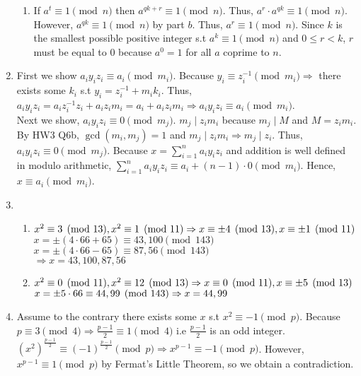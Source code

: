 \documentclass[10pt]{article}
\begin{document}
\begin{enumerate}[label= \arabic*.]
\begin{enumerate}
        \item If $a^t\equiv 1\pmod{n}$ then $a^{qk+r}\equiv 1\pmod{n}$. 
        Thus, $a^r\cdot a^{qk}\equiv 1\pmod{n}$. 
        However, $a^{qk}\equiv 1\pmod{n}$ by part $b$. 
        Thus, $a^r\equiv 1\pmod{n}$. 
        Since $k$ is the smallest possible positive integer s.t $a^k\equiv 1\pmod{n}$ and $0\le r<k$, $r$ must be equal to $0$ because $a^0=1$ for all $a$ coprime to $n$.
    \end{enumerate}
    \item First we show $a_i y_i z_i\equiv a_i\pmod{m_i}$. Because $y_i\equiv z_i^{-1}\pmod{m_i}\Rightarrow$ there exists some $k_i$ s.t $y_i=z_i^{-1}+m_ik_i$. 
    Thus, $a_i y_i z_i=a_i z_i^{-1}z_i+a_i z_i m_i=a_i+a_i z_i m_i\Rightarrow a_i y_i z_i\equiv a_i\pmod{m_i}$.\\
    Next we show, $a_i y_i z_i\equiv 0\pmod{m_j}$. $m_j\mid z_i m_i$ because $m_j\mid M$ and $M=z_i m_i$.
    By HW3 Q6b, $\gcd(m_i,m_j)=1$ and $m_j\mid z_i m_i\Rightarrow m_j\mid z_i$.
    Thus, $a_i y_i z_i\equiv 0\pmod{m_j}$.
    Because $x=\sum_{i=1}^{n}a_iy_iz_i$ and addition is well defined in modulo arithmetic, $\sum_{i=1}^{n}a_iy_iz_i\equiv a_i+(n-1)\cdot 0\pmod{m_i}$. 
    Hence, $x\equiv a_i\pmod{m_i}$.
    \item \begin{enumerate}
        \item $x^2\equiv 3\pmod{13},x^2\equiv 1\pmod{11}\\
        \Rightarrow x\equiv \pm4\pmod{13},x\equiv\pm 1\pmod{11}$\\
        $x=\pm(4\cdot 66+65)\equiv 43,100\pmod{143}$\\
        $x=\pm(4\cdot 66-65)\equiv 87,56\pmod{143}$\\
        $\Rightarrow x=43,100,87,56$
        \item $x^2\equiv 0\pmod{11},x^2\equiv 12\pmod{13}\\
        \Rightarrow x\equiv 0\pmod{11},x\equiv\pm 5\pmod{13}$\\
        $x=\pm 5\cdot 66\equiv 44,99\pmod{143}\\
        \Rightarrow x=44,99$
    \end{enumerate}
    \item Assume to the contrary there exists some $x$ s.t $x^2\equiv -1\pmod{p}$.
    Because $p\equiv 3\pmod{4}\Rightarrow \frac{p-1}{2}\equiv 1\pmod{4}$ i.e $\frac{p-1}{2}$ is an odd integer.
    ${(x^2)}^\frac{p-1}{2}\equiv {(-1)}^\frac{p-1}{2}\pmod{p}\Rightarrow x^{p-1}\equiv -1\pmod{p}$.
    However, $x^{p-1}\equiv 1\pmod{p}$ by Fermat's Little Theorem, so we obtain a contradiction.

\end{enumerate}
\end{document}

